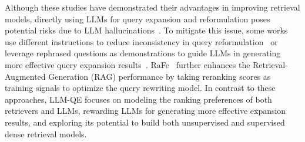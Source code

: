 Although these studies have demonstrated their advantages in improving retrieval models, directly using LLMs for query expansion and reformulation poses potential risks due to LLM hallucinations~\cite{shuster2021retrieval,huang2023survey}. To mitigate this issue, some works use different instructions to reduce inconsistency in query reformulation~\cite{gao2023precise} or leverage rephrased questions as demonstrations to guide LLMs in generating more effective query expansion results~\cite{koo2024optimizing}. RaFe~\cite{mao2024rafe} further enhances the Retrieval-Augmented Generation (RAG) performance by taking reranking scores as training signals to optimize the query rewriting model. In contrast to these approaches, LLM-QE focuses on modeling the ranking preferences of both retrievers and LLMs, rewarding LLMs for generating more effective expansion results, and exploring its potential to build both unsupervised and supervised dense retrieval models.

